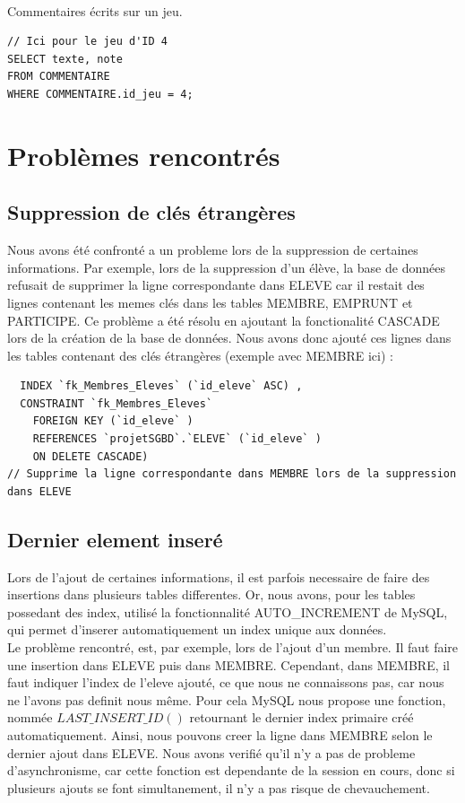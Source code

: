 \documentclass[a4paper, 11pt]{article}
\begin{document}
\paragraph{}
Commentaires écrits sur un jeu.
\begin{verbatim}
// Ici pour le jeu d'ID 4
SELECT texte, note 
FROM COMMENTAIRE
WHERE COMMENTAIRE.id_jeu = 4;
\end{verbatim}


\section{Problèmes rencontrés}
\subsection{Suppression de clés étrangères}
Nous avons été confronté a un probleme lors de la suppression de certaines informations. Par exemple, lors de la suppression d'un élève, la base de données refusait de supprimer la ligne correspondante dans ELEVE car il restait des lignes contenant les memes clés dans les tables MEMBRE, EMPRUNT et PARTICIPE. Ce problème a été résolu en ajoutant la fonctionalité CASCADE lors de la création de la base de données. Nous avons donc ajouté ces lignes dans les tables contenant des clés étrangères (exemple avec MEMBRE ici) :
\begin{verbatim}
  INDEX `fk_Membres_Eleves` (`id_eleve` ASC) ,
  CONSTRAINT `fk_Membres_Eleves`
    FOREIGN KEY (`id_eleve` )
    REFERENCES `projetSGBD`.`ELEVE` (`id_eleve` )
    ON DELETE CASCADE)  
// Supprime la ligne correspondante dans MEMBRE lors de la suppression dans ELEVE
\end{verbatim}
\subsection{Dernier element inseré}
Lors de l'ajout de certaines informations, il est parfois necessaire de faire des insertions dans plusieurs tables differentes. Or, nous avons, pour les tables possedant des index, utilisé la fonctionnalité AUTO\_INCREMENT de MySQL, qui permet d'inserer automatiquement un index unique aux données. 
\\Le problème rencontré, est, par exemple, lors de l'ajout d'un membre. Il faut faire une insertion dans ELEVE puis dans MEMBRE. Cependant, dans MEMBRE, il faut indiquer l'index de l'eleve ajouté, ce que nous ne connaissons pas, car nous ne l'avons pas definit nous même. Pour cela MySQL nous propose une fonction, nommée $LAST\_INSERT\_ID()$ retournant le dernier index primaire créé automatiquement. Ainsi, nous pouvons creer la ligne dans MEMBRE selon le dernier ajout dans ELEVE. Nous avons verifié qu'il n'y a pas de probleme d'asynchronisme, car cette fonction est dependante de la session en cours, donc si plusieurs ajouts se font simultanement, il n'y a pas risque de chevauchement.
\end{document}
